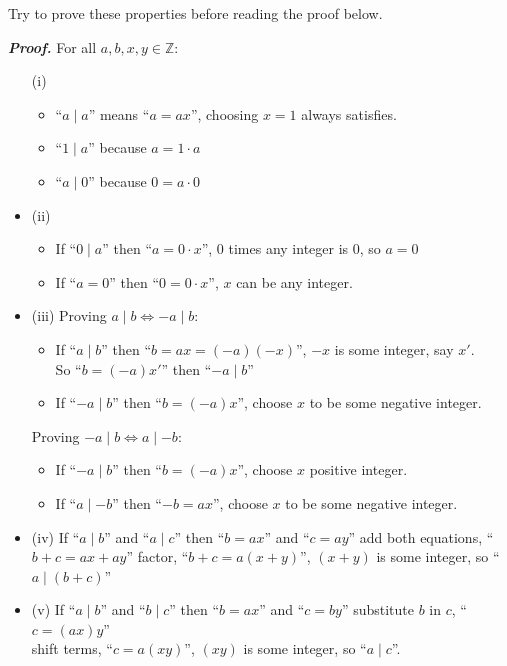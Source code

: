 \noindent
Try to prove these properties before reading the proof below.
\noindent
\begin{Proof}
    \textit{\textbf{Proof.}} For all $a, b, x,y \in \mathbb{Z}$:
    \begin{itemize}
        \item[(i)]  \begin {itemize}
        \item ``$a\mid a$'' means ``$a = ax$'', choosing $x = 1$ always satisfies.
        \item ``$1\mid a$'' because $a = 1\cdot a$
        \item ``$a\mid 0$'' because $0 = a\cdot 0$
    \end{itemize}
    \item[(ii)] \begin {itemize}
    \item If ``$0\mid a$'' then ``$a = 0\cdot x$'', 0 times any integer is 0, so $a = 0$
    \item If ``$a = 0$'' then ``$0 = 0\cdot x$'', $x$ can be any integer.
    \end {itemize}

    \noindent
    \item[(iii)]
    Proving $a\mid b \Longleftrightarrow -a\mid b$:
    \begin{itemize}
        \item If ``$a\mid b$'' then ``$b = ax = (-a)(-x)$'', $-x$ is some integer, say $x'$.\\
              So ``$b = (-a)x'$'' then ``$-a\mid b$''
        \item If ``$-a\mid b$'' then ``$b = (-a)x$'', choose $x$ to be some negative integer.\\
    \end{itemize}
    \vspace{-1em}
    Proving $-a\mid b \Longleftrightarrow a\mid -b$:
    \begin{itemize}
        \item If ``$-a\mid b$'' then ``$b = (-a)x$'', choose $x$ positive integer.
        \item If ``$a\mid -b$'' then ``$-b = ax$'', choose $x$ to be some negative integer.
    \end{itemize}
    \item[(iv)] If ``$a\mid b$'' and ``$a\mid c$'' then ``$b = ax$'' and ``$c = ay$'' add both equations, ``$b+c = ax+ay$''
    factor, ``$b+c = a(x+y)$'', $(x+y)$ is some integer, so ``$a\mid (b+c)$''

    \item[(v)] If ``$a\mid b$'' and ``$b\mid c$'' then ``$b = ax$'' and ``$c = by$'' substitute $b$ in $c$, ``$c = (ax)y$''\\
    shift terms, ``$c = a(xy)$'', $(xy)$ is some integer, so ``$a\mid c$''.
    \end{itemize}

\end{Proof}


